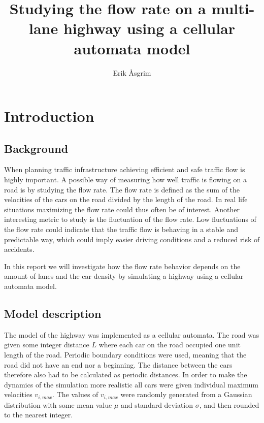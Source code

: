\documentclass[a4paper,12pt]{article}
\title{Studying the flow rate on a multi-lane highway using a cellular automata model}
\author{Erik Åsgrim}
\begin{document}
\maketitle

\section*{Introduction}
\subsection*{Background}
When planning traffic infrastructure achieving efficient and safe traffic flow is highly important.
A possible way of measuring how well traffic is flowing on a road is by studying the flow rate.
The flow rate is defined as the sum of the velocities of the cars on the road divided by the length of the road.
In real life situations maximizing the flow rate could thus often be of interest. Another interesting metric to study is the fluctuation of the 
flow rate. Low fluctuations of the flow rate could indicate that the traffic flow is behaving in a stable and predictable way, 
which could imply easier driving conditions and a reduced risk of accidents.

In this report we will investigate how the flow rate behavior depends on the amount of lanes and the car density by simulating
a highway using a cellular automata model.

\subsection*{Model description}
The model of the highway was implemented as a cellular automata. The road was given some integer distance $L$ where each car on the road occupied one unit length of the road. 
Periodic boundary conditions were used, meaning that the road did not have an end nor a beginning. The distance between the cars therefore also had to be calculated as periodic distances.
In order to make the dynamics of the simulation more realistic all cars were given individual maximum velocities $v_{i,max}$. The values of $v_{i, max}$ were randomly generated 
from a Gaussian distribution with some mean value $\mu$ and standard deviation $\sigma$, and then rounded to the nearest integer.
\end{document}
